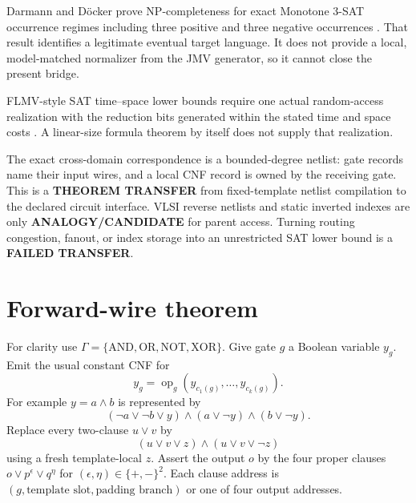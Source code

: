 \documentclass[11pt]{article}
\begin{document}
Darmann and D\"ocker prove NP-completeness for exact Monotone
3-SAT occurrence regimes including three positive and three negative
occurrences \cite{dd}.  That result identifies a legitimate eventual
target language.  It does not provide a local, model-matched normalizer
from the JMV generator, so it cannot close the present bridge.

FLMV-style SAT time--space lower bounds require one actual random-access
realization with the reduction bits generated within the stated time and
space costs \cite{flmv}.  A linear-size formula theorem by itself does not
supply that realization.

The exact cross-domain correspondence is a bounded-degree netlist: gate
records name their input wires, and a local CNF record is owned by the
receiving gate.  This is a \textbf{THEOREM TRANSFER} from fixed-template
netlist compilation to the declared circuit interface.  VLSI reverse
netlists and static inverted indexes are only \textbf{ANALOGY/CANDIDATE}
for parent access.  Turning routing congestion, fanout, or index storage
into an unrestricted SAT lower bound is a \textbf{FAILED TRANSFER}.

\section{Forward-wire theorem}

For clarity use $\Gamma=\{\mathrm{AND},\mathrm{OR},\mathrm{NOT},
\mathrm{XOR}\}$.  Give gate $g$ a Boolean variable $y_g$.  Emit the usual
constant CNF for
\[
 y_g=\operatorname{op}_g(y_{c_1(g)},\ldots,y_{c_k(g)}).
\]
For example $y=a\wedge b$ is represented by
\[
 (\neg a\vee\neg b\vee y)\wedge(a\vee\neg y)
 \wedge(b\vee\neg y).
\]
Replace every two-clause $u\vee v$ by
\[
 (u\vee v\vee z)\wedge(u\vee v\vee\neg z)
\]
using a fresh template-local $z$.  Assert the output $o$ by the four proper
clauses $o\vee p^{\epsilon}\vee q^{\eta}$ for
$(\epsilon,\eta)\in\{+,-\}^2$.  Each clause address is
$(g,\text{template slot},\text{padding branch})$ or one of four output
addresses.
\end{document}
